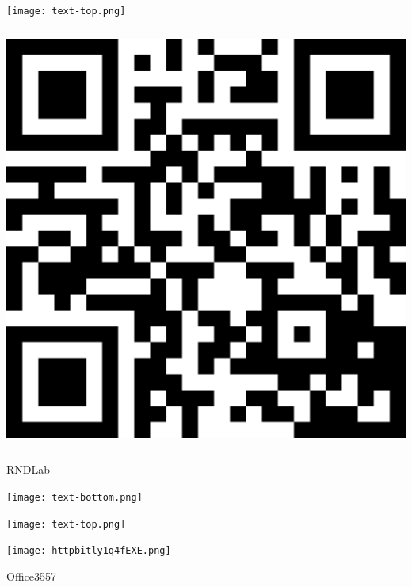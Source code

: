 \documentclass[letterpaper]{article}
\begin{document}
 
 \vspace*{\fill} 
 
  \centerline{\texttt{[image: text-top.png]}} 
 
 \vspace{0.5in} 
 
 \begingroup 
 \centerline{\includegraphics[scale=1,width=5.5in,height=5.5in]{RNDLab.png}} 
 \endgroup 
 \vspace*{\fill} 

 \hfill{\small RNDLab} 

  \vspace{0.7in} 
 
 \centerline{\texttt{[image: text-bottom.png]}} 
 
 \pagebreak 
{} 
 \vspace*{\fill} 
 
  \centerline{\texttt{[image: text-top.png]}} 
 
 \vspace{0.5in} 
 
 \begingroup 
 \centerline{\texttt{[image: httpbitly1q4fEXE.png]}} 
 \endgroup 
 \vspace*{\fill} 

 \hfill{\small Office3557} 

  \vspace{0.7in} 
 
\end{document}

